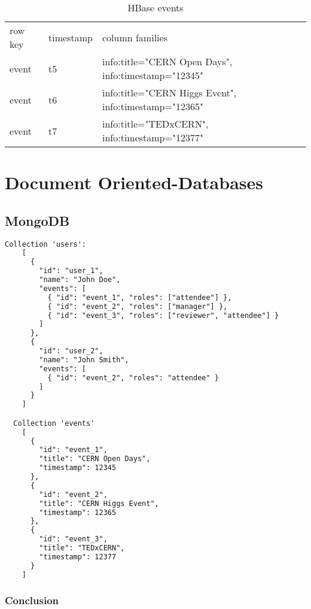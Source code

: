 \begin{table}[H]
  \centering
  \caption{HBase events}
  \renewcommand{\arraystretch}{1.5}
  \begin{tabular}{| >{\centering}m{0.6in} | >{\centering}m{0.8in} | >{\centering\arraybackslash}m{3.9in} |}
	\hline
    \multicolumn{3}{|c|}{\textbf{events}}
    \\ \hline
    row key & timestamp & column families
    \\ \hline
    event\textunderscore 1 & t5 & info:title="CERN Open Days", info:timestamp="12345"
    \\ \hline
    event\textunderscore 2 & t6 & info:title="CERN Higgs Event", info:timestamp="12365"
    \\ \hline
    event\textunderscore 3 & t7 & info:title="TEDxCERN", info:timestamp="12377"
    \\ \hline
  \end{tabular}
  \label{hbase-events}
\end{table}


\section{Document Oriented-Databases}

\subsection{MongoDB}

\begin{lstlisting}[language=HTML]
  Collection 'users':
    [
      {
        "id": "user_1",
        "name": "John Doe",
        "events": [
          { "id": "event_1", "roles": ["attendee"] },
          { "id": "event_2", "roles": ["manager"] },
          { "id": "event_3", "roles": ["reviewer", "attendee"] }
        ]
      },
      {
        "id": "user_2",
        "name": "John Smith",
        "events": [
          { "id": "event_2", "roles": "attendee" }
        ]
      }
    ]

  Collection 'events'
    [
      {
        "id": "event_1",
        "title": "CERN Open Days",
        "timestamp": 12345
      },
      {
        "id": "event_2",
        "title": "CERN Higgs Event",
        "timestamp": 12365
      },
      {
        "id": "event_3",
        "title": "TEDxCERN",
        "timestamp": 12377
      }
    ]
\end{lstlisting}

\subsubsection*{Conclusion}

